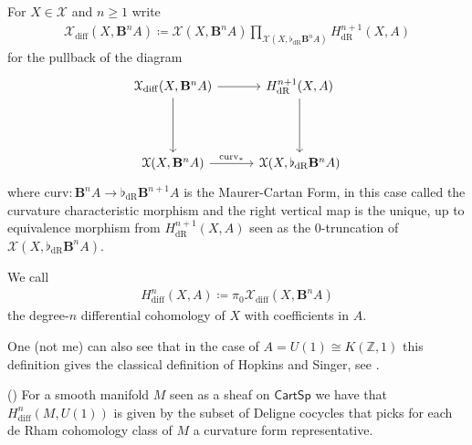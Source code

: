 \documentclass[10pt]{amsart}
\begin{document}
\begin{definition}
  For $X\in \mathcal{X}$ and $n\geq 1$ write
  \begin{align*}
    \mathcal{X}_{\mathrm{diff}}(X,\mathbf{B}^nA) \coloneqq
    \mathcal{X}(X,\mathbf{B}^nA )
    \prod_{\mathcal{X}(X,\flat_{\mathrm{dR}}\mathbf{B}^nA)} H_{\mathrm{dR}}^{n+1}(X,A)
  \end{align*}
  for the pullback of the diagram
   \begin{equation}
    \begin{tikzcd}[nodes in empty cells, column sep= 1cm, row sep=1.5cm]
      \mathcal{X}_{\mathrm{diff}}(X,\mathbf{B}^nA)
      \ar[d]
      \ar[r]
      &
      H_{\mathrm{dR}}^{n+1}(X,A)
      \ar[d]
      \\
      \mathcal{X}(X,\mathbf{B}^nA )
      \ar[r,"\mathrm{curv}_\ast"]
      &
      \mathcal{X}(X,\flat_{\mathrm{dR}}\mathbf{B}^nA)
    \end{tikzcd}
  \end{equation}
  where $\mathrm{curv} \colon \mathbf{B}^{n} A \rightarrow
  \flat_{\mathrm{dR}}\mathbf{B}^{n+1}A$ is the Maurer-Cartan Form, in
  this case called the curvature characteristic morphism and the right
  vertical map is the unique, up to equivalence morphism from
  $H_\mathrm{dR}^{n+1}(X,A)$ seen as the $0$-truncation of
  $\mathcal{X}(X,\flat_{\mathrm{dR}}\mathbf{B}^nA)$.

  We call
  \begin{align*}
    H_{\mathrm{diff}}^n(X,A) \coloneqq \pi_0 \mathcal{X}_{\mathrm{diff}}(X,\mathbf{B}^nA)
  \end{align*}
  the degree-$n$ differential cohomology of $X$ with coefficients in $A$.
\end{definition}

One (not me) can also see that in the case of $A = U(1) \cong K(\mathbb{Z},1)$
this definition gives the classical definition of Hopkins and Singer,
see \cite{hopkinssinger2005diffcoh}.

\begin{theorem}
  (\cite[Thm. 4.4.87.]{schreiber2013cohesive})
  For a smooth manifold $M$ seen as a sheaf on $\mathsf{CartSp}$ we
  have that $ H_{\mathrm{diff}}^n(M,U(1))$ is given by the subset of
  Deligne cocycles that picks for each de Rham cohomology class of $M$
  a curvature form representative.
\end{theorem}

\end{document}
